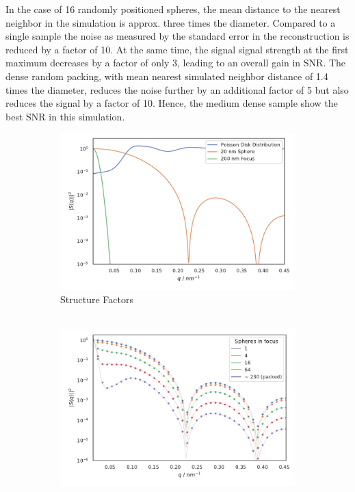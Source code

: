 In the case of 16 randomly positioned spheres, the mean distance to the nearest neighbor in the simulation is approx. three times the diameter. Compared to a single sample the noise as measured by the standard error in the reconstruction is reduced by a factor of 10. At the same time, the signal signal strength at the first maximum decreases by a factor of only 3, leading to an overall gain in SNR.  The dense random packing, with mean nearest simulated neighbor distance of 1.4 times the diameter, reduces the noise further by an additional factor of 5 but also reduces the signal by a factor of 10. Hence, the medium dense sample show the best SNR in this simulation.
 
\begin{figure}
	\centering
	\begin{subfigure}[b]{0.32\textwidth}
		\includegraphics[width=\linewidth]{images/multisphere1.pdf}
		\caption{Structure Factors\\$ $}
		\label{fig:multisphere1}
	\end{subfigure}
	\begin{subfigure}[b]{0.32\textwidth}
		\includegraphics[width=\linewidth]{images/multisphere3.pdf}

\end{subfigure}
\end{figure}
